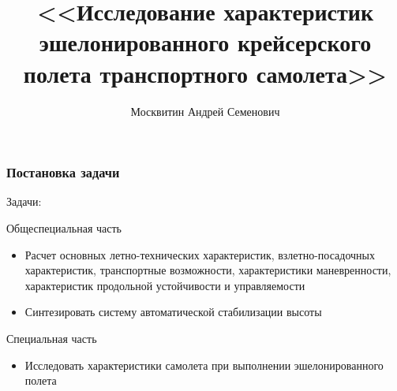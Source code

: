 \documentclass{beamer}
\title{<<Исследование характеристик эшелонированного крейсерского полета транспортного самолета>>}
\author{Москвитин Андрей Семенович}
\institute{М1О-403Б-18}
\date{}
\begin{document}
\begin{noheadline}
    \clearpage
    \thispagestyle{empty}
    \maketitle
\end{noheadline}

\begin{frame}
    \frametitle{Постановка задачи}
    \begin{center}
        \begin{minipage}{0.9\textwidth}
            \begin{block}{Задачи:}
                    \begin{block}{Общеспециальная часть}
                        \begin{itemize}
                            \item Расчет основных летно-технических характеристик, взлетно-посадочных
                                характеристик, транспортные возможности, характеристики
                                маневренности, характеристик продольной устойчивости и
                                управляемости 
                            \item Синтезировать систему автоматической стабилизации высоты 
                        \end{itemize}
                    \end{block}
                    \begin{block}{Специальная часть}
                        \begin{itemize}
                            \item Исследовать характеристики самолета при выполнении эшелонированного полета 
                        \end{itemize}
                    \end{block}
            \end{block}
        \end{minipage}
    \end{center}
\end{frame}
\end{document}
